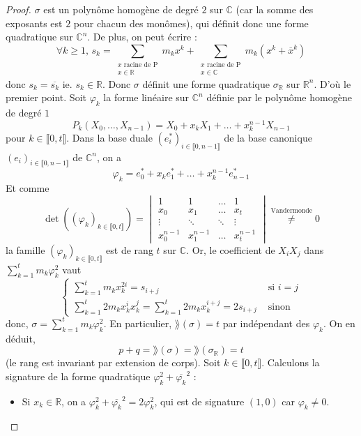   \begin{proof}
    $\sigma$ est un polynôme homogène de degré $2$ sur $\mathbb{C}$ (car la somme des exposants est $2$ pour chacun des monômes), qui définit donc une forme quadratique sur $\mathbb{C}^n$. De plus, on peut écrire :
    \[ \forall k \geq 1, \, s_k = \sum_{\substack{x \text{ racine de P} \\ x \in \mathbb{R}}} m_k x^k + \sum_{\substack{x \text{ racine de P} \\ x \in \mathbb{C}}} m_k (x^k + \overline{x}^k) \]
    donc $s_k = \overline{s_k}$ ie. $s_k \in \mathbb{R}$. Donc $\sigma$ définit une forme quadratique $\sigma_{\mathbb{R}}$ sur $\mathbb{R}^n$. D'où le premier point.
    \newpar
    Soit $\varphi_k$ la forme linéaire sur $\mathbb{C}^n$ définie par le polynôme homogène de degré $1$
    \[ P_k(X_0, \dots, X_{n-1}) = X_0 + x_k X_1 + \dots + x_k^{n-1} X_{n-1} \]
    pour $k \in \llbracket 0, t \rrbracket$. Dans la base duale $(e_i^*)_{i \in \llbracket 0, n-1 \rrbracket}$ de la base canonique $(e_i)_{i \in \llbracket 0, n-1 \rrbracket}$ de $\mathbb{C}^n$, on a
    \[ \varphi_k = e_0^* + x_k e_1^* + \dots + x_k^{n-1} e_{n-1}^* \]
    Et comme
    \[ \det((\varphi_k)_{k \in \llbracket 0, t \rrbracket}) = \begin{vmatrix} 1 & 1 & \dots & 1 \\ x_0 & x_1 & \dots & x_t \\ \vdots & \ddots & \ddots & \vdots \\ x_0^{n-1} & x_1^{n-1} & \dots & x_t^{n-1} \end{vmatrix} \overset{\text{Vandermonde}}{\neq} 0 \]
    la famille $(\varphi_k)_{k \in \llbracket 0, t \rrbracket}$ est de rang $t$ sur $\mathbb{C}$. Or, le coefficient de $X_i X_j$ dans $\sum_{k=1}^t m_k \varphi_k^2$ vaut
    \[ \begin{cases} \sum_{k=1}^t m_k x_k^{2i} = s_{i+j} &\text{ si } i=j \\ \sum_{k=1}^t 2 m_k x_k^i x_k^j = \sum_{k=1}^t 2 m_k x_k^{i+j} = 2s_{i+j} &\text{ sinon} \end{cases} \]
    donc, $\sigma = \sum_{k=1}^t m_k \varphi_k^2$. En particulier, $\rang (\sigma) = t$ par indépendant des $\varphi_k$. On en déduit,
    \[ p+q = \rang(\sigma) = \rang(\sigma_{\mathbb{R}}) = t \]
    (le rang est invariant par extension de corps).
    \newpar
    Soit $k \in \llbracket 0, t \rrbracket$. Calculons la signature de la forme quadratique $\varphi_k^2 + \overline{\varphi_k}^2$ :
    \begin{itemize}
      \item Si $x_k \in \mathbb{R}$, on a $\varphi_k^2 + \overline{\varphi_k}^2 = 2 \varphi_k^2$, qui est de signature $(1, 0)$ car $\varphi_k \neq 0$.

\end{itemize}
\end{proof}
